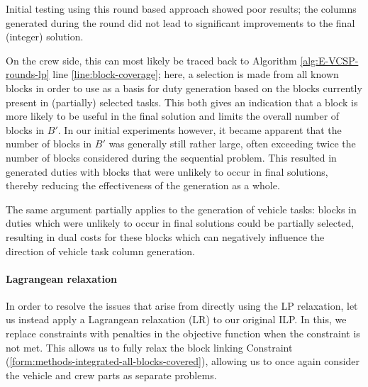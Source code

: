 \documentclass[]{article}
\begin{document}
Initial testing using this round based approach showed poor results; the columns generated during the round did not lead to significant improvements to the final (integer) solution. 

On the crew side, this can most likely be traced back to Algorithm \ref{alg:E-VCSP-rounds-lp} line {\ref{line:block-coverage}}; here, a selection is made from all known blocks in order to use as a basis for duty generation based on the blocks currently present in (partially) selected tasks. This both gives an indication that a block is more likely to be useful in the final solution and limits the overall number of blocks in $B'$. In our initial experiments however, it became apparent that the number of blocks in $B'$ was generally still rather large, often exceeding twice the number of blocks considered during the sequential problem. This resulted in generated duties with blocks that were unlikely to occur in final solutions, thereby reducing the effectiveness of the generation as a whole.

The same argument partially applies to the generation of vehicle tasks: blocks in duties which were unlikely to occur in final solutions could be partially selected, resulting in dual costs for these blocks which can negatively influence the direction of vehicle task column generation. 

\paragraph{Lagrangean relaxation} \label{sec:lagrangean-relaxation}
In order to resolve the issues that arise from directly using the LP relaxation, let us instead apply a Lagrangean relaxation (LR) to our original ILP. In this, we replace constraints with penalties in the objective function when the constraint is not met. This allows us to fully relax the block linking Constraint (\ref{form:methods-integrated-all-blocks-covered}), allowing us to once again consider the vehicle and crew parts as separate problems. 
\end{document}
